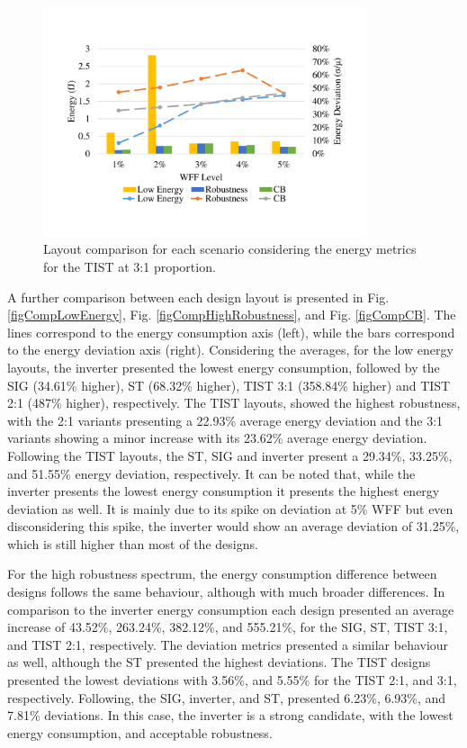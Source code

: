 \documentclass[pgmicro,diss,english]{iiufrgs}
\begin{document}
    \begin{figure}[H]
        \centering
            \includegraphics[width=0.85\textwidth, trim={1.25cm 3cm 2cm 3cm}, clip]{comp3Ltist312Energy.pdf}
            \caption{Layout comparison for each scenario considering the energy metrics for the TIST at 3:1 proportion.}
        \label{figscCompTIST31}
    \end{figure}

A further comparison between each design layout is presented in Fig. \ref{figCompLowEnergy}, Fig. \ref{figCompHighRobustness}, and Fig. \ref{figCompCB}. The lines correspond to the energy consumption axis (left), while the bars correspond to the energy deviation axis (right). Considering the averages, for the low energy layouts, the inverter presented the lowest energy consumption, followed by the SIG (34.61\% higher), ST (68.32\% higher), TIST 3:1 (358.84\% higher) and TIST 2:1 (487\% higher), respectively. The TIST layouts, showed the highest robustness, with the 2:1 variants presenting a 22.93\% average energy deviation and the 3:1 variants showing a minor increase with its 23.62\% average energy deviation. Following the TIST layouts, the ST, SIG and inverter present a 29.34\%, 33.25\%, and 51.55\% energy deviation, respectively. It can be noted that, while the inverter presents the lowest energy consumption it presents the highest energy deviation as well. It is mainly due to its spike on deviation at 5\% WFF but even disconsidering this spike, the inverter would show an average deviation of 31.25\%, which is still higher than most of the designs.

    For the high robustness spectrum, the energy consumption difference between designs follows the same behaviour, although with much broader differences. In comparison to the inverter energy consumption each design presented an average increase of 43.52\%, 263.24\%, 382.12\%, and 555.21\%, for the SIG, ST, TIST 3:1, and TIST 2:1, respectively. The deviation metrics presented a similar behaviour as well, although the ST presented the highest deviations. The TIST designs presented the lowest deviations with 3.56\%, and 5.55\% for the TIST 2:1, and 3:1, respectively. Following, the SIG, inverter, and ST, presented 6.23\%, 6.93\%, and 7.81\% deviations. In this case, the inverter is a strong candidate, with the lowest energy consumption, and acceptable robustness.
\end{document}

